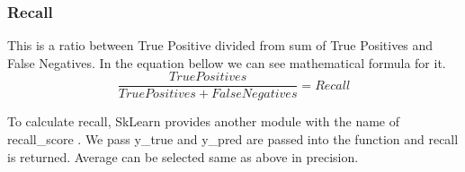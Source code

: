 \subsubsection{Recall}
This is a ratio between True Positive divided from sum of True Positives and False Negatives. In the equation bellow \parencite{davis2006relationship} we can see mathematical formula for it.
\[\frac{True Positives}{True Positives + False Negatives} = Recall \]

To calculate recall, SkLearn provides another module with the name of recall{\_}score \parencite{web:RecallScore}. We pass y{\_}true and y{\_}pred are passed into the function and recall is returned. Average can be selected same as above in precision.

